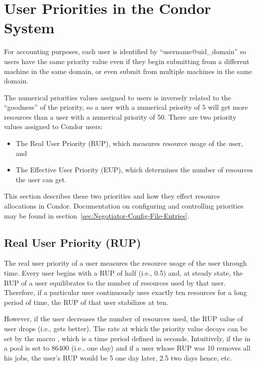\section{User Priorities in the Condor System}
\label{sec:UserPrio}
For accounting purposes, each user is identified by ``username@uid\_domain''
so users have the same priority value even if they begin submitting from a 
different machine in the same domain, or even submit from multiple machines 
in the same domain.

The numerical priorities values assigned to users is inversely related to the 
``goodness'' of the priority, so a user with a numerical priority of 5 will get 
more resources than a user with a numerical priority of 50.  There are two 
priority values assigned to Condor users:
\begin{itemize}
	\item The Real User Priority (RUP), which measures resource usage of the 
		user, and
	\item The Effective User Priority (EUP), which determines the number of
		resources the user can get.
\end{itemize}
This section describes these two priorities and how they effect resource
allocations in Condor.  Documentation on configuring and controlling 
priorities may be found in section~\ref{sec:Negotiator-Config-File-Entries}.

\subsection{Real User Priority (RUP)}
The real user priority of a user measures the resource usage of the user 
through time.  Every user begins with a RUP of half (i.e., 0.5) and,
at steady state, the RUP of a user equilibrates to the number of resources 
used by that user.  Therefore, if a particular user continuously uses exactly 
ten resources for a long period of time, the RUP of that user stabilizes at 
ten.

However, if the user decreases the number of resources used, the RUP value of 
user drops (i.e., gets better).  The rate at which the priority value decays 
can be set by the macro , which is a time period 
defined in seconds.   Intuitively, if the  in a pool 
is set to 86400 (i.e., one day) and if a user whose RUP was 10 removes all his 
jobs, the user's RUP would be 5 one day later, 2.5 two days hence, etc.

